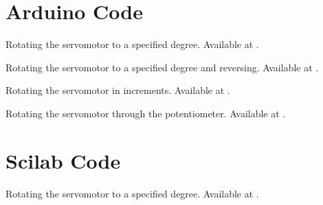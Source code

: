 \section{Arduino Code}
\lstset{style=mystyle}
\label{sec:servo-arduino-code}

\begin{ardcode}
   {Rotating
    the servomotor to a specified degree.  Available at
    .}
  \label{ard:servo-init}
  
\end{ardcode}

\begin{ardcode}
   {Rotating 
    the servomotor to a specified degree and reversing.  Available at
    .}
  \label{ard:servo-reverse}
  
\end{ardcode}

\begin{ardcode}
   {Rotating the
    servomotor in increments.  Available at
    .}
  \label{ard:servo-loop}
  
\end{ardcode}

\begin{ardcode}
  {Rotating the servomotor through the potentiometer.  Available at
    .}
  \label{ard:servo-pot}
  
\end{ardcode}


\section{Scilab Code}
\lstset{style=mystyle}
\label{sec:servo-scilab-code}

\begin{scicode}
   {Rotating
    the servomotor to a specified degree.  Available at
    .}
  \label{sci:servo-init}
  
\end{scicode}


